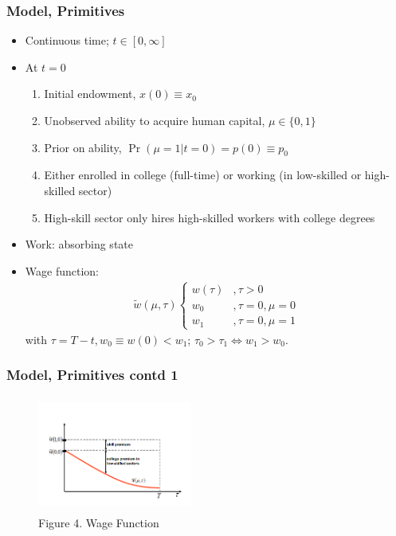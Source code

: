 \begin{frame}
	\frametitle{Model, Primitives}
		\begin{itemize}
			\item Continuous time; $t \in [0,\infty]$
			\item At $t=0$
				\begin{enumerate}
					\item Initial endowment, $x(0) \equiv x_{0}$
					\item Unobserved ability to acquire human capital, $\mu \in \{0,1\}$
					\item Prior on ability, $\Pr(\mu = 1 | t = 0) = p(0) \equiv p_{0}$
					\item Either enrolled in college (full-time) or working (in low-skilled or high-skilled sector)
					\item High-skill sector only hires high-skilled workers with college degrees
				\end{enumerate}
			\item Work: absorbing state
			\item Wage function:
				\begin{eqnarray}
						\tilde{w} \left( \mu, \tau \right)
							\begin{cases}
								w(\tau) &,  \tau > 0 \\
								w_{0}    &,  \tau = 0, \mu = 0 \\
								w_{1}   &,  \tau = 0, \mu = 1 
							\end{cases} 
				\end{eqnarray}
\noindent with $\tau = T - t, w_{0} \equiv w(0) < w_{1}$; $\tau_{0} > \tau_{1} \Leftrightarrow w_{1} > w_{0}$. 
		\end{itemize}
\end{frame}

\begin{frame}
	\frametitle{Model, Primitives contd 1}
		\begin{figure}[H] 
		\caption*{Figure 4. Wage Function}
		\centering
		\includegraphics[width=2in, height=1.5in]{Figures/OT/figure4.png}
		\end{figure}
\end{frame}

